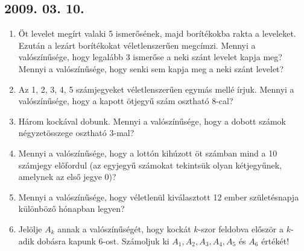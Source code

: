 \subsection*{2009. 03. 10.}
\begin{enumerate}
\item Öt levelet megírt valaki 5 ismerősének, majd borítékokba rakta a leveleket. Ezután a lezárt borítékokat véletlenszerűen megcímzi. Mennyi a valószínűsége, hogy legalább 3 ismerőse a neki szánt levelet kapja meg? Mennyi a valószínűsége, hogy senki sem kapja meg a neki szánt levelet? 

\item Az 1, 2, 3, 4, 5 számjegyeket véletlenszerűen egymás mellé írjuk. Mennyi a valószínűsége, hogy a kapott ötjegyű szám osztható 8-cal?

\item Három kockával dobunk. Mennyi a valószínűsége, hogy a dobott számok négyzetösszege osztható 3-mal?

\item Mennyi a valószínűsége, hogy a lottón kihúzott öt számban mind a 10 számjegy előfordul (az egyjegyű számokat tekintsük olyan kétjegyűnek, amelynek az első jegye 0)?

\item Mennyi a valószínűsége, hogy véletlenül kiválasztott 12 ember születésnapja különböző hónapban legyen?

\item Jelölje $A_k$ annak a valószínűségét, hogy kockát $k$-szor feldobva először a $k$-adik dobásra kapunk 6-ost. Számoljuk ki $A_1, A_2, A_3, A_4, A_5$ és $A_6$ értékét!
\end{enumerate}
